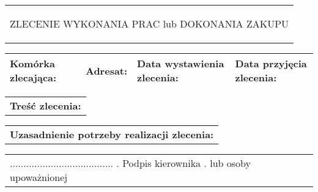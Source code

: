 \documentclass[11pt,a4paper]{article}
\begin{document}
\begin{tabularx}{\linewidth}{X}
\begin{center}
ZLECENIE WYKONANIA PRAC lub DOKONANIA ZAKUPU
\end{center}
\end{tabularx}

\begin{tabularx}{\textwidth}{|X|X|X|X|}
\hline
{\scriptsize \textbf{Komórka zlecająca:}}\newline
\newline
& {\scriptsize \textbf{Adresat:}}\newline
\newline
& {\scriptsize \textbf{Data wystawienia zlecenia:}}\newline
\newline
& {\scriptsize \textbf{Data przyjęcia zlecenia:}}\newline
\newline
\\ \hline
\end{tabularx}

\begin{tabularx}{\linewidth}{|X|}
{\footnotesize \textbf{Treść zlecenia:}}\newline

\newline
\\
\end{tabularx}


\begin{tabularx}{\linewidth}{|X|}
{\footnotesize \textbf{Uzasadnienie potrzeby realizacji zlecenia:}}\newline

\newline 
\\
\end{tabularx}

\begin{tabularx}{\linewidth}{|X|}

\hspace{14.5cm} {\scriptsize ......................................} \newline .
\hspace{14.5cm} {\scriptsize Podpis kierownika} \newline .
\hspace{14.2cm} {\scriptsize lub osoby upoważnionej}
\end{tabularx}
\end{document}
